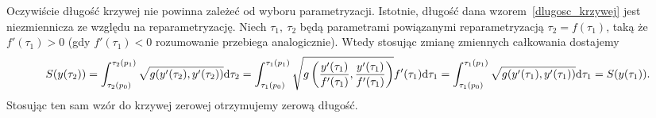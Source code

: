 Oczywiście 
długość krzywej nie powinna zależeć od wyboru parametryzacji.
Istotnie, długość dana wzorem~\eqref{dlugosc_krzywej}
jest niezmiennicza ze względu na reparametryzację.
Niech $\tau_1,\ \tau_2$ będą parametrami powiązanymi 
reparametryzacją $\tau_2 = f(\tau_1)$, taką że 
$f'(\tau_1) > 0$ (gdy $f'(\tau_1) <0$ rozumowanie 
przebiega analogicznie).
Wtedy stosując zmianę zmiennych całkowania dostajemy
\begin{align*}
S(y(\tau_2)) = 
\int_{\tau_2(p_0)}^{\tau_2(p_1)} \sqrt{g (
y' (\tau_2), y' (\tau_2) )} \text{d} \tau_2  = 
\int_{\tau_1(p_0)}^{\tau_1(p_1)} \sqrt{g \left(
\frac{ y' (\tau_1) }{ f'(\tau_1)}, 
\frac{ y' (\tau_1) }{ f'(\tau_1)} \right)} 
f'(\tau_1) \text{d} \tau_1  = 
\int_{\tau_1(p_0)}^{\tau_1(p_1)} \sqrt{g (
y' (\tau_1), y' (\tau_1)  )} \text{d} \tau_1  
=S(y(\tau_1)).
\end{align*}
Stosując ten sam wzór do krzywej zerowej otrzymujemy zerową
długość.

